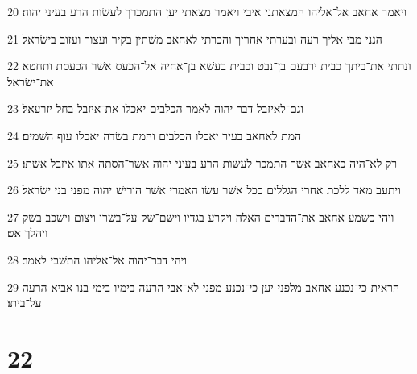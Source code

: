 \par 20 ויאמר אחאב אל־אליהו המצאתני איבי ויאמר מצאתי יען התמכרך לעשׂות הרע בעיני יהוה׃
\par 21 הנני מבי אליך רעה ובערתי אחריך והכרתי לאחאב משׁתין בקיר ועצור ועזוב בישׂראל׃
\par 22 ונתתי את־ביתך כבית ירבעם בן־נבט וכבית בעשׁא בן־אחיה אל־הכעס אשׁר הכעסת ותחטא את־ישׂראל׃
\par 23 וגם־לאיזבל דבר יהוה לאמר הכלבים יאכלו את־איזבל בחל יזרעאל׃
\par 24 המת לאחאב בעיר יאכלו הכלבים והמת בשׂדה יאכלו עוף השׁמים׃
\par 25 רק לא־היה כאחאב אשׁר התמכר לעשׂות הרע בעיני יהוה אשׁר־הסתה אתו איזבל אשׁתו׃
\par 26 ויתעב מאד ללכת אחרי הגללים ככל אשׁר עשׂו האמרי אשׁר הורישׁ יהוה מפני בני ישׂראל׃
\par 27 ויהי כשׁמע אחאב את־הדברים האלה ויקרע בגדיו וישׂם־שׂק על־בשׂרו ויצום וישׁכב בשׂק ויהלך אט׃
\par 28 ויהי דבר־יהוה אל־אליהו התשׁבי לאמר׃
\par 29 הראית כי־נכנע אחאב מלפני יען כי־נכנע מפני לא־אבי הרעה בימיו בימי בנו אביא הרעה על־ביתו׃

\chapter{22}


